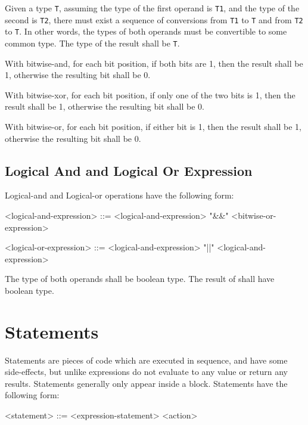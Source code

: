 Given a type \texttt{T}, assuming the type of the first operand is \texttt{T1}, and the type of the second is \texttt{T2}, there must exist a sequence of conversions from \texttt{T1} to \texttt{T} and from \texttt{T2} to \texttt{T}. In other words, the types of both operands must be convertible to some common type. The type of the result shall be \texttt{T}.

With bitwise-and, for each bit position, if both bits are 1, then the result shall be 1, otherwise the resulting bit shall be 0. 

With bitwise-xor, for each bit position, if only one of the two bits is 1, then the result shall be 1, otherwise the resulting bit shall be 0.

With bitwise-or, for each bit position, if either bit is 1, then the result shall be 1, otherwise the resulting bit shall be 0.

\subsection{Logical And and Logical Or Expression} \label{guide:logical_expr}

Logical-and and Logical-or operations have the following form:

\begin{minip}
\begin{grammar}
<logical-and-expression> ::= <logical-and-expression> "\&\&" <bitwise-or-expression>

<logical-or-expression> ::= <logical-and-expression> "||" <logical-and-expression>
\end{grammar}
\end{minip}

The type of both operands shall be boolean type. The result of shall have boolean type.

\section{Statements} \label{guide:statements}

Statements are pieces of code which are executed in sequence, and have some side-effects, but unlike expressions do not evaluate to any value or return any results. Statements generally only appear inside a block. Statements have the following form:

\begin{minip}
\begin{grammar}
<statement> ::=
<expression-statement>
\alt <action>
\end{grammar}
\end{minip}

